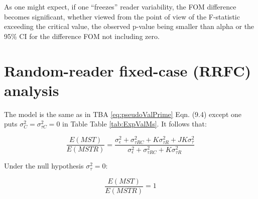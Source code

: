 \documentclass[
]{book}
\newenvironment{Shaded}{\begin{snugshade}}{\end{snugshade}}
\newcommand{\CommentTok}[1]{\textcolor[rgb]{0.56,0.35,0.01}{\textit{#1}}}
\newcommand{\DecValTok}[1]{\textcolor[rgb]{0.00,0.00,0.81}{#1}}
\newcommand{\KeywordTok}[1]{\textcolor[rgb]{0.13,0.29,0.53}{\textbf{#1}}}
\newcommand{\NormalTok}[1]{#1}
\newcommand{\OperatorTok}[1]{\textcolor[rgb]{0.81,0.36,0.00}{\textbf{#1}}}
\newcommand{\StringTok}[1]{\textcolor[rgb]{0.31,0.60,0.02}{#1}}
\begin{document}
\begin{Shaded}
\end{Shaded}

As one might expect, if one ``freezes'' reader variability, the FOM difference becomes significant, whether viewed from the point of view of the F-statistic exceeding the critical value, the observed p-value being smaller than alpha or the 95\% CI for the difference FOM not including zero.

\hypertarget{DBMSpecialCases-RRFCAnalysis}{%
\section{Random-reader fixed-case (RRFC) analysis}\label{DBMSpecialCases-RRFCAnalysis}}

The model is the same as in TBA \eqref{eq:pseudoValPrime} Eqn. (9.4) except one puts \(\sigma_C^2 = \sigma_{\tau C}^2 =0\) in Table Table \ref{tab:ExpValMs}. It follows that:

\begin{equation}
\frac{E(MST)}{E(MSTR)}=\frac{\sigma_\epsilon^2+\sigma_{\tau RC}^2+K\sigma_{\tau R}^2+JK\sigma_{\tau}^2}{\sigma_\epsilon^2+\sigma_{\tau RC}^2+K\sigma_{\tau R}^2}
\end{equation}

Under the null hypothesis \(\sigma_\tau^2 = 0\):

\begin{equation}
\frac{E(MST)}{E(MSTR)}=1
\end{equation}
\end{document}
